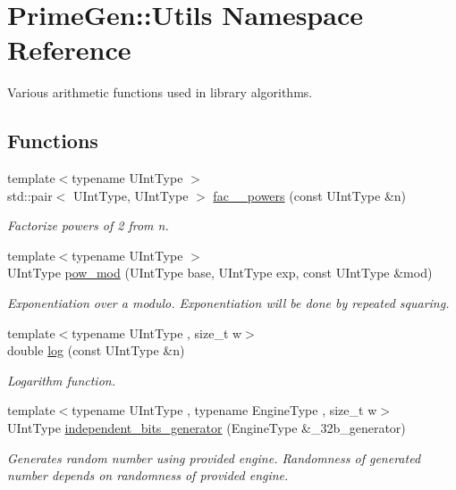 \hypertarget{namespace_prime_gen_1_1_utils}{\section{Prime\+Gen\+:\+:Utils Namespace Reference}
\label{namespace_prime_gen_1_1_utils}
}


Various arithmetic functions used in library algorithms.  


\subsection*{Functions}
\begin{DoxyCompactItemize}
\item 
{\footnotesize template$<$typename U\+Int\+Type $>$ }\\std\+::pair$<$ U\+Int\+Type, U\+Int\+Type $>$ \hyperlink{namespace_prime_gen_1_1_utils_a35a61b9560765cd3e254be8e8f8ad8c1}{fac\+\_\+\_\+powers} (const U\+Int\+Type \&n)
\begin{DoxyCompactList}\small\item\em Factorize powers of 2 from n. \end{DoxyCompactList}\item 
{\footnotesize template$<$typename U\+Int\+Type $>$ }\\U\+Int\+Type \hyperlink{namespace_prime_gen_1_1_utils_a640cffdfe9303cbe0eb0205165c3161e}{pow\+\_\+mod} (U\+Int\+Type base, U\+Int\+Type exp, const U\+Int\+Type \&mod)
\begin{DoxyCompactList}\small\item\em Exponentiation over a modulo. Exponentiation will be done by repeated squaring. \end{DoxyCompactList}\item 
{\footnotesize template$<$typename U\+Int\+Type , size\+\_\+t w$>$ }\\double \hyperlink{namespace_prime_gen_1_1_utils_ab651d715c25dfed57573d950ee5451c7}{log} (const U\+Int\+Type \&n)
\begin{DoxyCompactList}\small\item\em Logarithm function. \end{DoxyCompactList}\item 
{\footnotesize template$<$typename U\+Int\+Type , typename Engine\+Type , size\+\_\+t w$>$ }\\U\+Int\+Type \hyperlink{namespace_prime_gen_1_1_utils_a279cd6b89aca43a9597f58aa4a7b5807}{independent\+\_\+bits\+\_\+generator} (Engine\+Type \&\+\_\+32b\+\_\+generator)
\begin{DoxyCompactList}\small\item\em Generates random number using provided engine. Randomness of generated number depends on randomness of provided engine. \end{DoxyCompactList}\end{DoxyCompactItemize}


